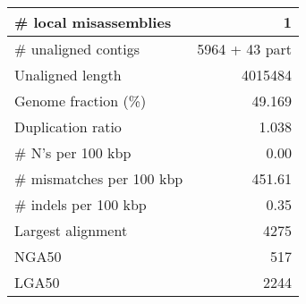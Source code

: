 \documentclass[12pt,a4paper]{article}
\begin{document}
\begin{table}[ht]
\begin{center}
\begin{tabular}{|l*{1}{|r}|}
\# local misassemblies & 1 \\ \hline
\# unaligned contigs & 5964 + 43 part \\ \hline
Unaligned length & 4015484 \\ \hline
Genome fraction (\%) & 49.169 \\ \hline
Duplication ratio & 1.038 \\ \hline
\# N's per 100 kbp & 0.00 \\ \hline
\# mismatches per 100 kbp & 451.61 \\ \hline
\# indels per 100 kbp & 0.35 \\ \hline
Largest alignment & 4275 \\ \hline
NGA50 & 517 \\ \hline
LGA50 & 2244 \\ \hline
\end{tabular}
\end{center}
\end{table}
\end{document}
